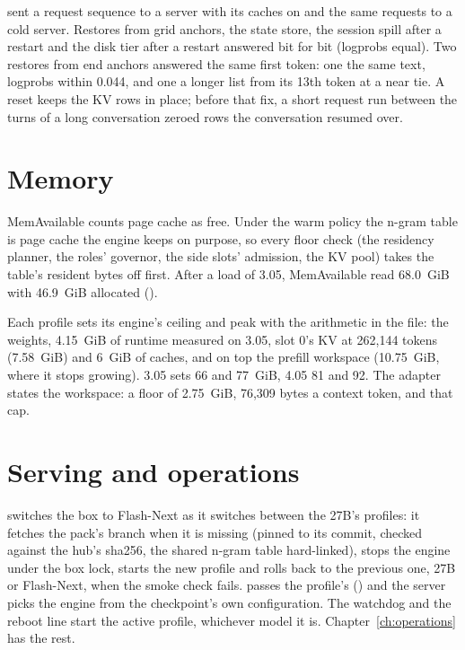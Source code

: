  sent a request sequence to a server with its caches on and the same requests to a cold server. Restores from grid anchors, the state store, the session spill after a restart and the disk tier after a restart answered bit for bit (logprobs equal). Two restores from end anchors answered the same first token: one the same text, logprobs within 0.044, and one a longer list from its 13th token at a near tie. A reset keeps the KV rows in place; before that fix, a short request run between the turns of a long conversation zeroed rows the conversation resumed over.

\section{Memory}

MemAvailable counts page cache as free. Under the warm policy the n-gram table is page cache the engine keeps on purpose, so every floor check (the residency planner, the roles' governor, the side slots' admission, the KV pool) takes the table's resident bytes off first. After a load of 3.05, MemAvailable read 68.0~GiB with 46.9~GiB allocated (\measured).

Each profile sets its engine's ceiling and peak with the arithmetic in the file: the weights, 4.15~GiB of runtime measured on 3.05, slot 0's KV at 262,144 tokens (7.58~GiB) and 6~GiB of caches, and on top the prefill workspace (10.75~GiB, where it stops growing). 3.05 sets 66 and 77~GiB, 4.05 81 and 92. The adapter states the workspace: a floor of 2.75~GiB, 76,309 bytes a context token, and that cap.

\section{Serving and operations}

 switches the box to Flash-Next as it switches between the 27B's profiles: it fetches the pack's branch when it is missing (pinned to its commit, checked against the hub's sha256, the shared n-gram table hard-linked), stops the engine under the box lock, starts the new profile and rolls back to the previous one, 27B or Flash-Next, when the smoke check fails.  passes the profile's  () and the server picks the engine from the checkpoint's own configuration. The watchdog and the reboot line start the active profile, whichever model it is. Chapter~\ref{ch:operations} has the rest.

